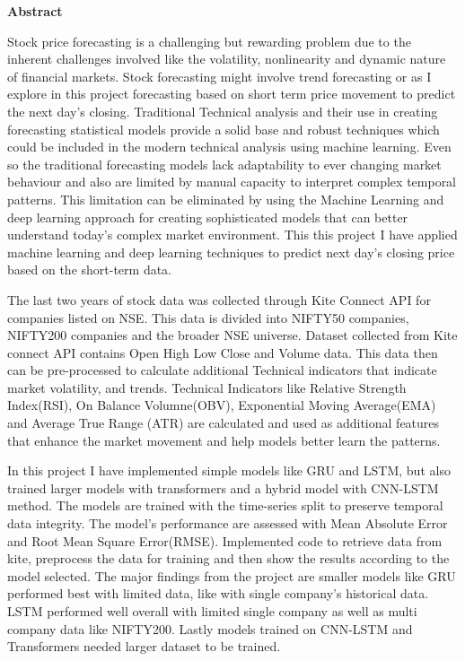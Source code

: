 \begin{center}
    \LARGE
    \textbf{Abstract}
    
    \vspace{2cm}
\end{center}
Stock price forecasting is a challenging but rewarding problem due to the inherent challenges involved like the volatility, nonlinearity and dynamic nature of financial markets. Stock forecasting might involve trend forecasting or as I explore in this project forecasting based on short term price movement to predict the next day's closing. Traditional Technical analysis and their use in creating forecasting statistical models provide a solid base and robust techniques which could be included in the modern technical analysis using machine learning. Even so the traditional forecasting models lack adaptability to ever changing market behaviour and also are limited by manual capacity to interpret complex temporal patterns. This limitation can be eliminated by using the Machine Learning and deep learning approach for creating sophisticated models that can better understand today's complex market environment. This this project I have applied machine learning and deep learning techniques to predict next day's closing price based on the short-term data.

The last two years of stock data was collected through Kite Connect API for companies listed on NSE. This data is divided into NIFTY50 companies, NIFTY200 companies and the broader NSE universe. Dataset collected from Kite connect API contains Open High Low Close and Volume data. This data then can be pre-processed to calculate additional Technical indicators that indicate market volatility, and trends. Technical Indicators like Relative Strength Index(RSI), On Balance Volumne(OBV), Exponential Moving Average(EMA) and Average True Range (ATR) are calculated and used as additional features that enhance the market movement and help models better learn the patterns.

In this project I have implemented simple models like GRU and LSTM, but also trained larger models with transformers and a hybrid model with CNN-LSTM method. The models are trained with the time-series split to preserve temporal data integrity. The model's performance are assessed with Mean Absolute Error and Root Mean Square Error(RMSE). Implemented code to retrieve data from kite, preprocess the data for training and then show the results according to the model selected. The major findings from the project are smaller models like GRU performed best with limited data, like with single company's historical data. LSTM performed well overall with limited single company as well as multi company data like NIFTY200. Lastly models trained on CNN-LSTM and Transformers needed larger dataset to be trained. 

\clearpage
